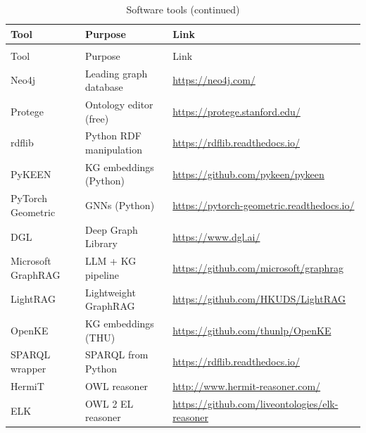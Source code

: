 \documentclass[11pt,a4paper,oneside,openany]{book}
\theoremstyle{definition}
\theoremstyle{plain}
\theoremstyle{remark}
\begin{document}
\begin{longtable}{lp{5cm}p{5cm}}
	\caption{Software tools}
	\label{tab:res-software}                                                                            \\
	\toprule
	Tool               & Purpose                 & Link                                                 \\
	\midrule
	\endfirsthead
	\caption[]{Software tools (continued)}                                                              \\
	\toprule
	Tool               & Purpose                 & Link                                                 \\
	\midrule
	\endhead
	\bottomrule
	\endfoot
	Neo4j              & Leading graph database  & \url{https://neo4j.com/}                             \\
	Protege            & Ontology editor (free)  & \url{https://protege.stanford.edu/}                  \\
	rdflib             & Python RDF manipulation & \url{https://rdflib.readthedocs.io/}                 \\
	PyKEEN             & KG embeddings (Python)  & \url{https://github.com/pykeen/pykeen}               \\
	PyTorch Geometric  & GNNs (Python)           & \url{https://pytorch-geometric.readthedocs.io/}      \\
	DGL                & Deep Graph Library      & \url{https://www.dgl.ai/}                            \\
	Microsoft GraphRAG & LLM + KG pipeline       & \url{https://github.com/microsoft/graphrag}          \\
	LightRAG           & Lightweight GraphRAG    & \url{https://github.com/HKUDS/LightRAG}              \\
	OpenKE             & KG embeddings (THU)     & \url{https://github.com/thunlp/OpenKE}               \\
	SPARQL wrapper     & SPARQL from Python      & \url{https://rdflib.readthedocs.io/}                 \\
	HermiT             & OWL reasoner            & \url{http://www.hermit-reasoner.com/}                \\
	ELK                & OWL 2 EL reasoner       & \url{https://github.com/liveontologies/elk-reasoner} \\
\end{longtable}

\end{document}
